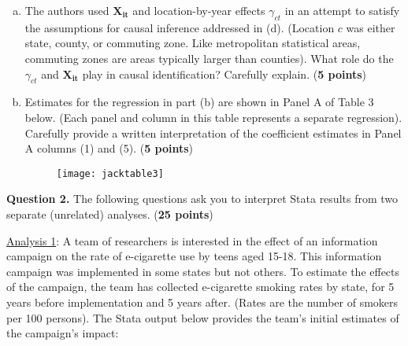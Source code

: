 \documentclass[12pt]{article}
\begin{document}
\begin{enumerate}[(a)]
\item The authors used $\mathbf{X_{it}}$ and location-by-year effects $\gamma_{ct}$ in an attempt to satisfy the assumptions for causal inference addressed in (d). (Location $c$ was either state, county, or commuting zone. Like metropolitan statistical areas, commuting zones are areas typically larger than counties). What role do the $\gamma_{ct}$ and $\mathbf{X_{it}}$ play in causal identification? Carefully explain. ({\bf 5 points})

\item Estimates for the regression in part (b) are shown in Panel A of Table 3 below. (Each panel and column in this table represents a separate regression). Carefully provide a written interpretation of the coefficient estimates in Panel A columns (1) and (5). ({\bf 5 points})

\pagebreak%

\begin{figure}[h!]
\begin{center}
\texttt{[image: jacktable3]} 
\end{center}
\end{figure}


\end{enumerate}


\pagebreak

\textbf{Question 2.} The following questions ask you to interpret Stata results from two separate (unrelated) analyses. ({\bf 25 points})
\bigskip

\underline{Analysis 1}: A team of researchers is interested in the effect of an information campaign on the rate of e-cigarette use by teens aged 15-18. This information campaign was implemented in some states but not others. To estimate the effects of the campaign, the team has collected e-cigarette smoking rates by state, for 5 years before implementation and 5 years after. (Rates are the number of smokers per 100 persons). The Stata output below provides the team's initial estimates of the campaign's impact:
\end{document}
